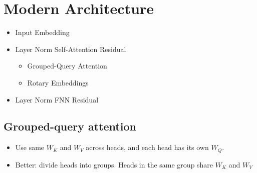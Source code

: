 \section{Modern Architecture}
\begin{itemize}
    \item Input Embedding
    \item Layer Norm \textrightarrow{} Self-Attention \textrightarrow{} Residual
        \begin{itemize}
            \item Grouped-Query Attention
            \item Rotary Embeddings
        \end{itemize}
    \item Layer Norm \textrightarrow{} FNN \textrightarrow{} Residual
\end{itemize}

\subsection{Grouped-query attention}
\begin{itemize}
    \item Use same $W_K$ and $W_V$ across heads, and each head has its own $W_Q.$
    \item Better: divide heads into groups. Heads in the same group share $W_K$ and $W_V$
\end{itemize}

